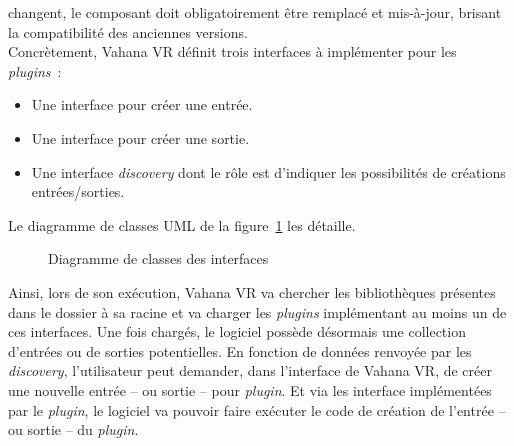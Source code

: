 changent, le composant doit obligatoirement être remplacé et mis-à-jour, brisant la compatibilité
des anciennes versions.\cite{poc}\\ 
\newline
Concrètement, Vahana VR définit trois interfaces à implémenter pour les \textit{plugins}~:
\begin{itemize}
  \item Une interface pour créer une entrée.
  \item Une interface pour créer une sortie.
  \item Une interface \textit{discovery} dont le rôle est d'indiquer les possibilités
    de créations entrées/sorties.
\end{itemize}
Le diagramme de classes UML de la figure~\ref{uml-interfaces} les détaille.\\
\begin{figure}
  \centering
  \caption{Diagramme de classes des interfaces}
  \label{uml-interfaces}
\end{figure}
Ainsi, lors de son exécution, Vahana VR va chercher les bibliothèques présentes dans le dossier
 à sa racine et va charger les \textit{plugins} implémentant
au moins un de ces interfaces. Une fois chargés, le logiciel possède désormais une collection d'entrées
ou de sorties potentielles. En fonction de données renvoyée par les \textit{discovery},
l'utilisateur peut demander, dans l'interface de Vahana VR, de 
créer une nouvelle entrée -- ou sortie -- pour \textit{plugin}. Et via les
interface implémentées par le \textit{plugin}, le logiciel va pouvoir faire exécuter le code
de création de l'entrée -- ou sortie -- du \textit{plugin}.\\

